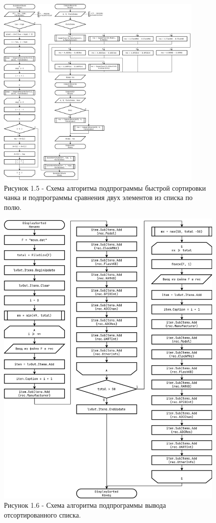 \documentclass[oneside,a4paper,14pt]{extarticle}
\begin{document}
\clearpage
\begin{figure}[H]
	\centering
	\includegraphics[width=0.9\textwidth]{pics/flowchart5.png}
	\caption*{Рисунок 1.5 - Схема алгоритма подпрограммы быстрой сортировки чанка и подпрограммы сравнения двух элементов из списка по полю.}
\end{figure}

\clearpage
\begin{figure}[H]
	\centering
	\includegraphics[height=0.9\textheight]{pics/flowchart6.png}
	\caption*{Рисунок 1.6 - Схема алгоритма подпрограммы вывода отсортированного списка.}
\end{figure}
\end{document}
